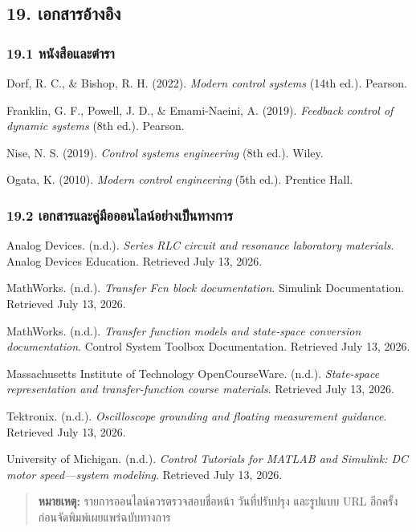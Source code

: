 
\subsection{19. เอกสารอ้างอิง}

\subsubsection{19.1 หนังสือและตำรา}

Dorf, R. C., \& Bishop, R. H. (2022). \textit{Modern control systems} (14th ed.). Pearson.

Franklin, G. F., Powell, J. D., \& Emami-Naeini, A. (2019). \textit{Feedback control of dynamic systems} (8th ed.). Pearson.

Nise, N. S. (2019). \textit{Control systems engineering} (8th ed.). Wiley.

Ogata, K. (2010). \textit{Modern control engineering} (5th ed.). Prentice Hall.

\subsubsection{19.2 เอกสารและคู่มือออนไลน์อย่างเป็นทางการ}

Analog Devices. (n.d.). \textit{Series RLC circuit and resonance laboratory materials}. Analog Devices Education. Retrieved July 13, 2026.

MathWorks. (n.d.). \textit{Transfer Fcn block documentation}. Simulink Documentation. Retrieved July 13, 2026.

MathWorks. (n.d.). \textit{Transfer function models and state-space conversion documentation}. Control System Toolbox Documentation. Retrieved July 13, 2026.

Massachusetts Institute of Technology OpenCourseWare. (n.d.). \textit{State-space representation and transfer-function course materials}. Retrieved July 13, 2026.

Tektronix. (n.d.). \textit{Oscilloscope grounding and floating measurement guidance}. Retrieved July 13, 2026.

University of Michigan. (n.d.). \textit{Control Tutorials for MATLAB and Simulink: DC motor speed—system modeling}. Retrieved July 13, 2026.

\begin{quote}
\textbf{หมายเหตุ:} รายการออนไลน์ควรตรวจสอบชื่อหน้า วันที่ปรับปรุง และรูปแบบ URL อีกครั้งก่อนจัดพิมพ์เผยแพร่ฉบับทางการ
\end{quote}

